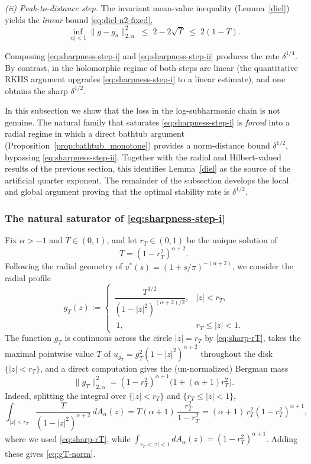 \documentclass[a4paper,10pt]{amsart}
\begin{document}
\smallskip\noindent\emph{(ii) Peak-to-distance step.} The invariant mean-value
inequality (Lemma~\ref{diel}) yields the \emph{linear} bound
\eqref{eq:diel-n2-fixed},
\begin{equation}\label{eq:sharpness-step-ii}
\inf_{|a|<1}\|g-g_a\|_{2,\alpha}^2\;\le\;2-2\sqrt T\;\le\;2(1-T).
\end{equation}

\smallskip
Composing \eqref{eq:sharpness-step-i} and \eqref{eq:sharpness-step-ii} produces
the rate $\delta^{1/4}$. By contrast, in the holomorphic regime of
\cite{GomezKalajMelentijevicRamos2025} both steps are linear (the
quantitative RKHS argument upgrades \eqref{eq:sharpness-step-i} to a linear
estimate), and one obtains the sharp $\delta^{1/2}$.

In this subsection we show that the loss in the log-subharmonic chain is not
genuine. The natural family that saturates
\eqref{eq:sharpness-step-i} is \emph{forced} into a radial regime in which a
direct bathtub argument (Proposition~\ref{prop:bathtub_monotone}) provides a
norm-distance bound $\delta^{1/2}$, bypassing
\eqref{eq:sharpness-step-ii}. Together with the radial and Hilbert-valued
results of the previous section, this identifies Lemma~\ref{diel} as the
source of the artificial quarter exponent. The remainder of the subsection
develops the local and global argument proving that the optimal stability rate
is $\delta^{1/2}$.

\subsubsection*{The natural saturator of \eqref{eq:sharpness-step-i}}

Fix $\alpha>-1$ and $T\in(0,1)$, and let $r_T\in(0,1)$ be the unique solution of
\begin{equation}\label{eq:sharp-rT}
T=(1-r_T^2)^{\alpha+2}.
\end{equation}
Following the radial geometry of $v^*(s)=(1+s/\pi)^{-(\alpha+2)}$, we consider
the radial profile
\begin{equation}\label{eq:saturating-profile}
g_T(z):=
\begin{cases}
\dfrac{T^{1/2}}{(1-|z|^2)^{(\alpha+2)/2}},& |z|<r_T,\\[8pt]
\;1,& r_T\le |z|<1.
\end{cases}
\end{equation}
The function $g_T$ is continuous across the circle $|z|=r_T$ by
\eqref{eq:sharp-rT}, takes the maximal pointwise value $T$ of
$u_{g_T}=g_T^2(1-|z|^2)^{\alpha+2}$ throughout the disk $\{|z|<r_T\}$, and a
direct computation gives the (un-normalized) Bergman mass
\begin{equation}\label{eq:gT-norm}
\|g_T\|_{2,\alpha}^2
=
(1-r_T^2)^{\alpha+1}\bigl(1+(\alpha+1)r_T^2\bigr).
\end{equation}
Indeed, splitting the integral over $\{|z|<r_T\}$ and $\{r_T\le|z|<1\}$,
\[
\int_{|z|<r_T}\frac{T}{(1-|z|^2)^{\alpha+2}}\,dA_\alpha(z)
=
T(\alpha+1)\,\frac{r_T^2}{1-r_T^2}
=
(\alpha+1)\,r_T^2(1-r_T^2)^{\alpha+1},
\]
where we used \eqref{eq:sharp-rT}, while
$\int_{r_T<|z|<1}dA_\alpha(z)=(1-r_T^2)^{\alpha+1}$. Adding these gives
\eqref{eq:gT-norm}.
\end{document}
